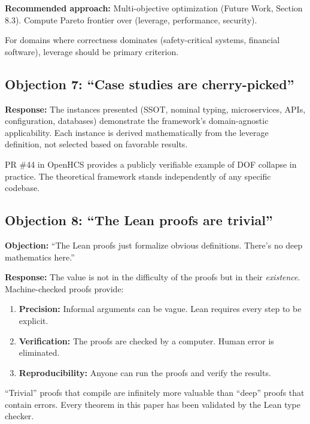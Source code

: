 \textbf{Recommended approach:} Multi-objective optimization (Future Work, Section 8.3). Compute Pareto frontier over (leverage, performance, security).

For domains where correctness dominates (safety-critical systems, financial software), leverage should be primary criterion.

\subsection{Objection 7: ``Case studies are cherry-picked''}

\textbf{Response:} The instances presented (SSOT, nominal typing, microservices, APIs, configuration, databases) demonstrate the framework's domain-agnostic applicability. Each instance is derived mathematically from the leverage definition, not selected based on favorable results.

PR \#44 in OpenHCS provides a publicly verifiable example of DOF collapse in practice. The theoretical framework stands independently of any specific codebase.

\subsection{Objection 8: ``The Lean proofs are trivial''}

\textbf{Objection:} ``The Lean proofs just formalize obvious definitions. There's no deep mathematics here.''

\textbf{Response:} The value is not in the difficulty of the proofs but in their \emph{existence}. Machine-checked proofs provide:

\begin{enumerate}
\item \textbf{Precision:} Informal arguments can be vague. Lean requires every step to be explicit.
\item \textbf{Verification:} The proofs are checked by a computer. Human error is eliminated.
\item \textbf{Reproducibility:} Anyone can run the proofs and verify the results.
\end{enumerate}

``Trivial'' proofs that compile are infinitely more valuable than ``deep'' proofs that contain errors. Every theorem in this paper has been validated by the Lean type checker.
